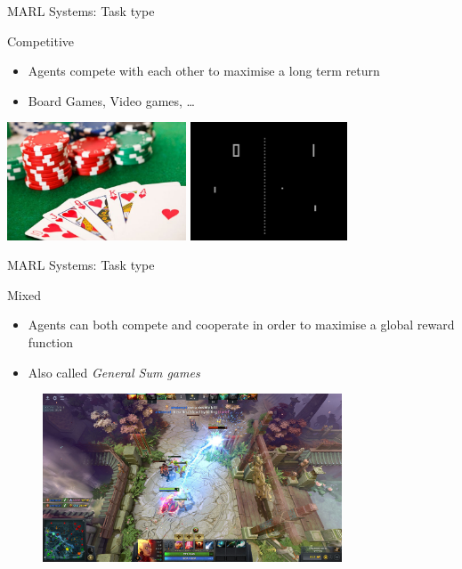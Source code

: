 \documentclass[presentation, 8pt]{beamer}\mode<presentation>{\usetheme{AMSBolognaFC}}
\begin{document}
	\begin{frame}{MARL Systems: Task type}
		\begin{exampleblock}{Competitive}
			\begin{itemize}
				\item Agents compete with each other to maximise a long term return
				\item Board Games, Video games, \dots
			\end{itemize}
		\end{exampleblock}
	
		\centering
		\includegraphics[height=3.5cm]{img/competitive.jpg}
		\includegraphics[height=3.5cm]{img/ping.png}
		
	\end{frame}
	
	\begin{frame}{MARL Systems: Task type}
		\begin{exampleblock}{Mixed}
			\begin{itemize}
				\item Agents can both compete and cooperate in order to maximise a global reward function
				\item Also called \textit{General Sum games}
			\end{itemize}
		\end{exampleblock}
	
		\begin{figure}
			\includegraphics[height=5cm]{img/mixed}
		\end{figure}
	\end{frame}
	
\end{document}
